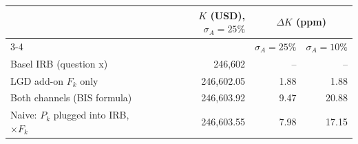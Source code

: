 \begin{tabular}{lrrr}
\toprule
 & $K$ (USD), $\sigma_A=25\%$ & \multicolumn{2}{c}{$\Delta K$ (ppm)} \\
\cmidrule(lr){3-4}
 & & $\sigma_A=25\%$ & $\sigma_A=10\%$ \\
\midrule
Basel IRB (question x) & 246,602 & -- & -- \\
LGD add-on $F_k$ only & 246,602.05 & 1.88 & 1.88 \\
Both channels (BIS formula) & 246,603.92 & 9.47 & 20.88 \\
Naive: $P_k$ plugged into IRB, $\times F_k$ & 246,603.55 & 7.98 & 17.15 \\
\bottomrule
\end{tabular}
